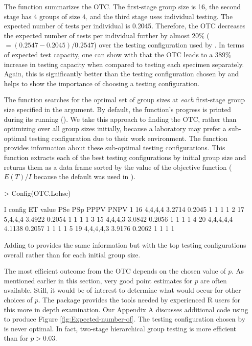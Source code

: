 \noindent The  function summarizes the OTC. The
first-stage group size is 16, the second stage has 4 groups of size
4, and the third stage uses individual testing. The expected number
of tests per individual is 0.2045. Therefore, the OTC decreases the
expected number of tests per individual further by almost 20\% ($=(0.2547-0.2045)/0.2547$)
over the testing configuration used by \citet{lohse2020pooling}.
In terms of expected test capacity, one can show with 
that the OTC leads to a 389\% increase in testing capacity when compared
to testing each specimen separately. Again, this is significantly
better than the testing configuration chosen by \citet{lohse2020pooling}
and helps to show the importance of choosing a testing configuration.

The  function searches for the optimal set of group
sizes at \emph{each} first-stage group size specified in the 
argument. By default, the function's progress is printed during its
running (). We take this approach to finding the
OTC, rather than optimizing over all group sizes initially, because
a laboratory may prefer a sub-optimal testing configuration due to
their work environment. The  function provides information
about these sub-optimal testing configurations. This function extracts
each of the best testing configurations by initial group size and
returns them as a data frame sorted by the value of the objective
function ($E(T)/I$ because the default was used in ).

\begin{Schunk}
\begin{Sinput}
> Config(OTC.Lohse)
\end{Sinput}
\begin{Soutput}
   I    config     ET  value PSe PSp PPPV PNPV
1 16   4,4,4,4 3.2714 0.2045   1   1    1    1
2 17   5,4,4,4 3.4922 0.2054   1   1    1    1
3 15   4,4,4,3 3.0842 0.2056   1   1    1    1
4 20 4,4,4,4,4 4.1138 0.2057   1   1    1    1
5 19 4,4,4,4,3 3.9176 0.2062   1   1    1    1
\end{Soutput}
\end{Schunk}

\noindent Adding  to  provides
the same information but with the top testing configurations overall
rather than for each initial group size.

The most efficient outcome from the OTC depends on the chosen value
of $p$. As mentioned earlier in this section, very good point estimates
for $p$ are often available. Still, it would be of interest to determine
what would occur for other choices of $p$. The  package
provides the tools needed by experienced R users for this more in
depth examination. Our Appendix A discusses additional code using
 to produce Figure \ref{fig:Expected-number-of}. The
testing configuration chosen by \citet{lohse2020pooling} is never
optimal. In fact, two-stage hierarchical group testing is more efficient
than \citet{lohse2020pooling} for $p>0.03$. 


